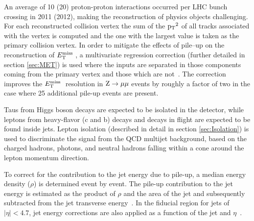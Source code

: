 

An average of 10 (20) proton-proton interactions occurred per LHC bunch crossing in 2011 (2012), 
making the reconstruction of physics objects challenging. For each reconstructed collision vertex the 
sum of the $\mathrm{p_{T}}^2$ of all tracks associated with the vertex is computed and the one with the largest 
value is taken as the primary collision vertex. In order to mitigate the effects of pile--up on the 
reconstruction of $E_\mathrm{T}^{\mathrm{miss}}\;$, a multivariate regression correction (further detailed in section \ref{sec:MET}) 
is used where the inputs are separated in those components coming from the primary vertex and those 
which are not~\cite{CMS-PAS-JME-12-002}. 
The correction improves the $E_\mathrm{T}^{\mathrm{miss}}\;$ resolution in $\mathrm{Z}\rightarrow\mathrm{\mu}\mathrm{\mu}$ events by roughly a 
factor of two in the case where 25 additional pile-up events are present. 

Taus from Higgs boson decays are expected to be isolated in the detector, while leptons from 
heavy-flavor (c and b) decays and decays in flight are expected to be found inside jets.  
Lepton isolation (described in detail in section \ref{sec:Isolation}) 
is used to discriminate the signal from the QCD multijet background, 
based on the charged hadrons, photons, and neutral hadrons falling within a cone around the 
lepton momentum direction.

To correct for the contribution to the jet energy due to pile-up, a median energy 
density ($\rho$) is determined event by event. The pile-up contribution to the jet 
energy is estimated as the product of $\rho$ and the area of the jet and subsequently 
subtracted from the jet transverse energy~\cite{Cacciari:subtraction}. In the fiducial 
region for jets of $|\eta| < 4.7$, jet energy corrections are also applied as a function 
of the jet \ET and $\eta$~\cite{cmsJEC}.


